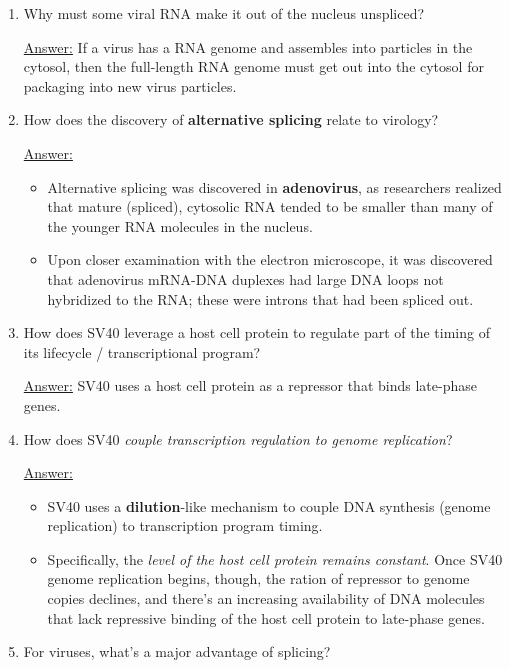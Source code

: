 \documentclass{article}
\newenvironment{QandA}{\begin{enumerate}[label=\bfseries Q\arabic*.]}
                       {\end{enumerate}}
\newenvironment{answered}{\par\normalfont\underline{Answer:}}{}
\begin{document}
\begin{QandA}
  \item{Why must some viral RNA make it out of the nucleus unspliced?}
    \begin{answered}
    If a virus has a RNA genome and assembles into particles in the cytosol, then the full-length RNA genome must get out into the cytosol for packaging into new virus particles.
    \end{answered}
  \item{How does the discovery of \textbf{alternative splicing} relate to virology?}
    \begin{answered}
    \begin{itemize}
      \item{Alternative splicing was discovered in \textbf{adenovirus}, as researchers realized that mature (spliced), cytosolic RNA tended to be smaller than many of the younger RNA molecules in the nucleus.}
      \item{Upon closer examination with the electron microscope, it was discovered that adenovirus mRNA-DNA duplexes had large DNA loops not hybridized to the RNA; these were introns that had been spliced out.}
    \end{itemize}
    \end{answered}
  \item{How does SV40 leverage a host cell protein to regulate part of the timing of its lifecycle / transcriptional program?}
    \begin{answered}
    SV40 uses a host cell protein as a repressor that binds late-phase genes.
    \end{answered}
  \item{How does SV40 \textit{couple transcription regulation to genome replication}?}
    \begin{answered}
    \begin{itemize}
      \item{SV40 uses a \textbf{dilution}-like mechanism to couple DNA synthesis (genome replication) to transcription program timing.}
      \item{Specifically, the \textit{level of the host cell protein remains constant}. Once SV40 genome replication begins, though, the ration of repressor to genome copies declines, and there's an increasing availability of DNA molecules that lack repressive binding of the host cell protein to late-phase genes.}
    \end{itemize}
    \end{answered}
  \item{For viruses, what's a major advantage of splicing?}

\end{QandA}
\end{document}
